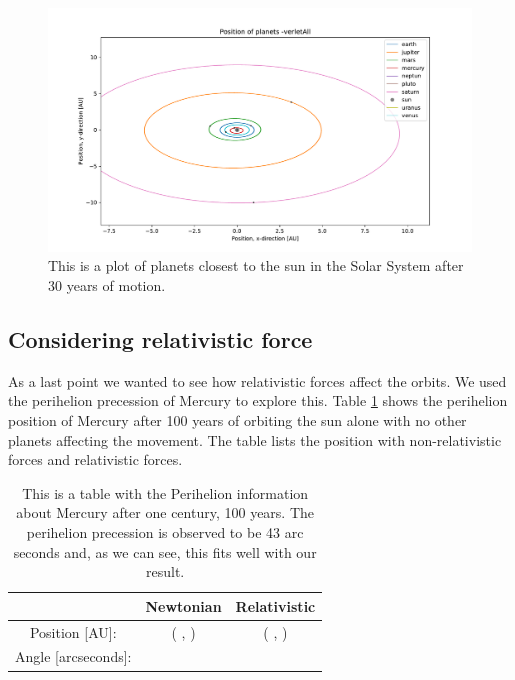 \begin{figure}[H]
\includegraphics[width=1\linewidth]{../results/plots/innerplanets-verletAll.pdf}\caption{This is a plot of planets closest to the sun in the Solar System after 30 years of motion.}\label{fig:solarsystem_innerplanets}
\end{figure}
	
\subsection{Considering relativistic force}
	
As a last point we wanted to see how relativistic forces affect the orbits. We used the perihelion precession of Mercury to explore this. Table \ref{tab:Perihelion} shows the perihelion position of Mercury after 100 years of orbiting the sun alone with no other planets affecting the movement. The table lists the position with non-relativistic forces and relativistic forces.
	
\begin{table}\caption{This is a table with the Perihelion information about Mercury after one century, 100 years. The perihelion precession is observed to be 43 arc seconds and, as we can see, this fits well with our result.}\label{tab:Perihelion}
\begin{tabular}{ccc}
 & Newtonian & Relativistic\\ \hline
Position [AU]: & ( , ) & ( , )\\
Angle [arcseconds]: & & \\
\end{tabular}
\end{table}
